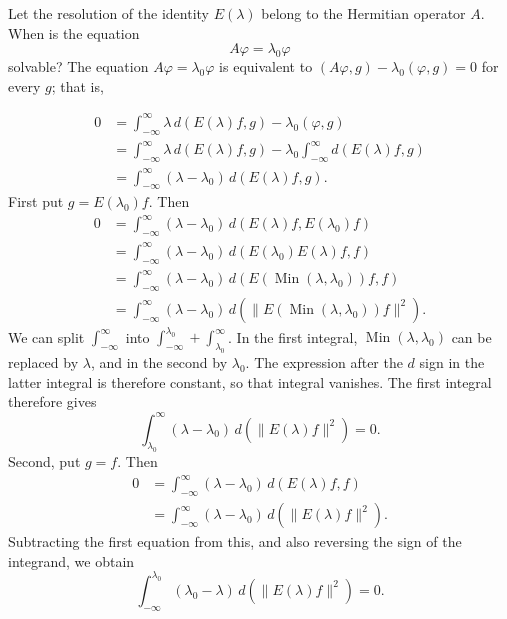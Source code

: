 \documentclass[fontsize=13pt,twoside,openany,headings=normal,parskip=false,bookmarkpackage=false,DIV=calc]{scrbook}
\begin{document}
Let the resolution of the identity $E(\lambda)$ belong to the Hermitian operator $A$. When is the equation
\[
A\varphi=\lambda_0\varphi
\]
solvable? The equation $A\varphi=\lambda_0\varphi$ is equivalent to $(A\varphi,g)-\lambda_0(\varphi,g)=0$ for every $g$; that is,

\hypertarget{origpage-63}{}%
\begin{align*}
0&=\int_{-\infty}^{\infty}\lambda\,d(E(\lambda)f,g)-\lambda_0(\varphi,g)\\
&=\int_{-\infty}^{\infty}\lambda\,d(E(\lambda)f,g)-\lambda_0\int_{-\infty}^{\infty}d(E(\lambda)f,g)\\
&=\int_{-\infty}^{\infty}(\lambda-\lambda_0)\,d(E(\lambda)f,g).
\end{align*}
First put $g=E(\lambda_0)f$. Then
\begin{align*}
0&=\int_{-\infty}^{\infty}(\lambda-\lambda_0)\,d(E(\lambda)f,E(\lambda_0)f)\\
&=\int_{-\infty}^{\infty}(\lambda-\lambda_0)\,d(E(\lambda_0)E(\lambda)f,f)\\
&=\int_{-\infty}^{\infty}(\lambda-\lambda_0)\,d(E(\operatorname{Min}(\lambda,\lambda_0))f,f)\\
&=\int_{-\infty}^{\infty}(\lambda-\lambda_0)\,d(\|E(\operatorname{Min}(\lambda,\lambda_0))f\|^2).
\end{align*}
We can split $\int_{-\infty}^{\infty}$ into $\int_{-\infty}^{\lambda_0}+\int_{\lambda_0}^{\infty}$. In the first integral, $\operatorname{Min}(\lambda,\lambda_0)$ can be replaced by $\lambda$, and in the second by $\lambda_0$. The expression after the $d$ sign in the latter integral is therefore constant, so that integral vanishes. The first integral therefore gives
\[
\int_{\lambda_0}^{\infty}(\lambda-\lambda_0)\,d(\|E(\lambda)f\|^2)=0.
\]
Second, put $g=f$. Then
\begin{align*}
0&=\int_{-\infty}^{\infty}(\lambda-\lambda_0)\,d(E(\lambda)f,f)\\
&=\int_{-\infty}^{\infty}(\lambda-\lambda_0)\,d(\|E(\lambda)f\|^2).
\end{align*}
Subtracting the first equation from this, and also reversing the sign of the integrand, we obtain
\[
\int_{-\infty}^{\lambda_0}(\lambda_0-\lambda)\,d(\|E(\lambda)f\|^2)=0.
\]
\end{document}
